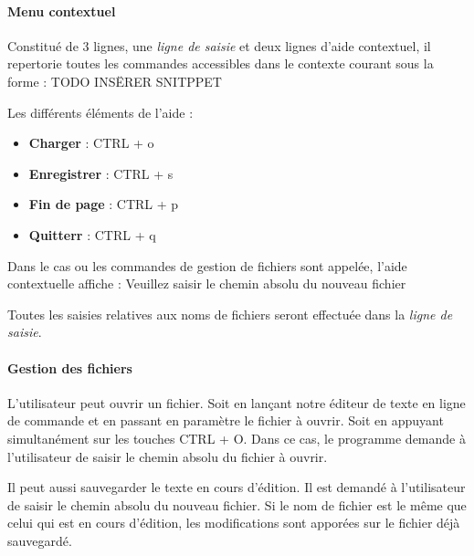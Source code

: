 \paragraph{Menu contextuel}
Constitué de 3 lignes, une \textsl{ligne de saisie} et deux lignes d'aide contextuel, il repertorie toutes les commandes accessibles dans le contexte courant sous la forme :
TODO INSËRER SNITPPET

Les différents éléments de l'aide :
\begin{itemize}
	\item \textbf{Charger} : \og CTRL + o\fg
	\item \textbf{Enregistrer} : \og CTRL + s\fg
	\item \textbf{Fin de page} : \og CTRL + p\fg
	\item \textbf{Quitterr} : \og CTRL + q\fg
\end{itemize}

Dans le cas ou les commandes de gestion de fichiers sont appelée, l'aide contextuelle affiche : \og Veuillez saisir le chemin absolu du nouveau fichier\fg

Toutes les saisies relatives aux noms de fichiers seront effectuée dans la \textsl{ligne de saisie}.

\paragraph{Gestion des fichiers}
L'utilisateur peut ouvrir un fichier. Soit en lançant notre éditeur de texte en ligne de commande et en passant en paramètre le fichier à ouvrir. Soit en appuyant simultanément sur les touches \og CTRL + O\fg. Dans ce cas, le programme demande à l'utilisateur de saisir le chemin absolu du fichier à ouvrir.

Il peut aussi sauvegarder le texte en cours d'édition. Il est demandé à l'utilisateur de saisir le chemin absolu du nouveau fichier. Si le nom de fichier est le même que celui qui est en cours d'édition, les modifications sont apporées sur le fichier déjà sauvegardé.
